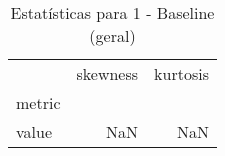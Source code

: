 \begin{table}[htbp]
\caption{Estatísticas para 1 - Baseline (geral)}
\label{tab:1_-_baseline_(geral)_skewkurt}
\begin{tabular}{lrr}
\toprule
 & skewness & kurtosis \\
metric &  &  \\
\midrule
value & NaN & NaN \\
\bottomrule
\end{tabular}
\end{table}
